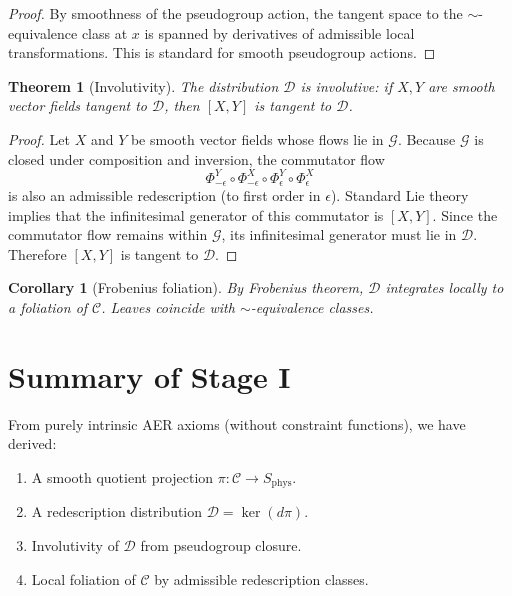 \documentclass[11pt]{article}
\newtheorem{theorem}[definition]{Theorem}
\newtheorem{corollary}[definition]{Corollary}
\theoremstyle{remark}
\theoremstyle{plain}
\begin{document}
\begin{proof}
By smoothness of the pseudogroup action,
the tangent space to the $\sim$-equivalence class at $x$
is spanned by derivatives of admissible local transformations.
This is standard for smooth pseudogroup actions.
\end{proof}

\begin{theorem}[Involutivity]
The distribution $\mathcal{D}$ is involutive:
if $X,Y$ are smooth vector fields tangent to $\mathcal{D}$,
then $[X,Y]$ is tangent to $\mathcal{D}$.
\end{theorem}

\begin{proof}
Let $X$ and $Y$ be smooth vector fields whose flows lie in $\mathcal{G}$.
Because $\mathcal{G}$ is closed under composition and inversion,
the commutator flow
\[
\Phi_{-\epsilon}^Y \circ \Phi_{-\epsilon}^X \circ \Phi_\epsilon^Y \circ \Phi_\epsilon^X
\]
is also an admissible redescription (to first order in $\epsilon$).
Standard Lie theory implies that the infinitesimal generator of this commutator
is $[X,Y]$.
Since the commutator flow remains within $\mathcal{G}$,
its infinitesimal generator must lie in $\mathcal{D}$.
Therefore $[X,Y]$ is tangent to $\mathcal{D}$.
\end{proof}

\begin{corollary}[Frobenius foliation]
By Frobenius theorem,
$\mathcal{D}$ integrates locally to a foliation of $\mathcal{C}$.
Leaves coincide with $\sim$-equivalence classes.
\end{corollary}

\section{Summary of Stage I}

From purely intrinsic AER axioms (without constraint functions),
we have derived:

\begin{enumerate}
\item A smooth quotient projection $\pi:\mathcal{C}\to S_{\mathrm{phys}}$.
\item A redescription distribution $\mathcal{D}=\ker(d\pi)$.
\item Involutivity of $\mathcal{D}$ from pseudogroup closure.
\item Local foliation of $\mathcal{C}$ by admissible redescription classes.
\end{enumerate}
\end{document}
